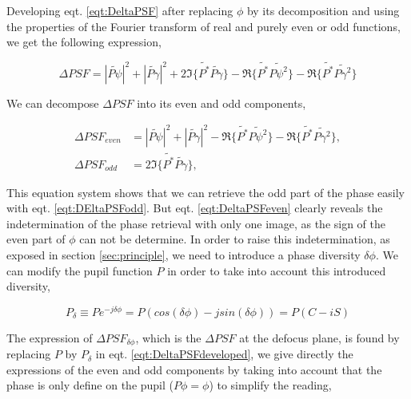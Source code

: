 Developing eqt. \eqref{eqt:DeltaPSF} after replacing $\phi$ by its decomposition and using the properties of the Fourier transform of real and purely even or odd functions, we get the following expression,

\begin{equation}
\Delta PSF = |\widetilde{P\psi}|^2 + |\widetilde{P\gamma}|^2 + 2\Im\lbrace \widetilde{P^*}\widetilde{P \gamma}\rbrace - \Re\lbrace \widetilde{P^*}\widetilde{P \psi^2}\rbrace- \Re\lbrace \widetilde{P^*}\widetilde{P \gamma^2}\rbrace
\label{eqt:DeltaPSFdeveloped}
\end{equation}

We can decompose $\Delta PSF$ into its even and odd components,

\begin{align}
\Delta PSF_{even} &= |\widetilde{P\psi}|^2 + |\widetilde{P\gamma}|^2 - \Re\lbrace \widetilde{P^*}\widetilde{P \psi^2}\rbrace- \Re\lbrace \widetilde{P^*}\widetilde{P \gamma^2}\rbrace, \label{eqt:DeltaPSFeven}\\
\Delta PSF_{odd} &= 2\Im\lbrace \widetilde{P^*}\widetilde{P \gamma}\rbrace \label{eqt:DEltaPSFodd},
\end{align}

This equation system shows that we can retrieve the odd part of the phase easily with eqt. \eqref{eqt:DEltaPSFodd}. But eqt. \eqref{eqt:DeltaPSFeven} clearly reveals the indetermination of the phase retrieval with only one image, as the sign of the even part of $\phi$ can not be determine. In order to raise this indetermination, as exposed in section \ref{sec:principle}, we need to introduce a phase diversity $\delta\phi$. We can modify the pupil function $P$ in order to take into account this introduced diversity,

\begin{equation}
P_{\delta} \equiv P e^{-j\delta\phi} = P(cos(\delta\phi)-jsin(\delta\phi)) = P(C-iS) 
\label{eqt:pupilDeltaphi}
\end{equation}

The expression of $\Delta PSF_{\delta\phi}$, which is the $\Delta PSF$ at the defocus plane, is found by replacing $P$ by $P_{\delta}$ in eqt. \eqref{eqt:DeltaPSFdeveloped}, we give directly the expressions of the even and odd components by taking into account that the phase is only define on the pupil ($P\phi=\phi$) to simplify the reading,

